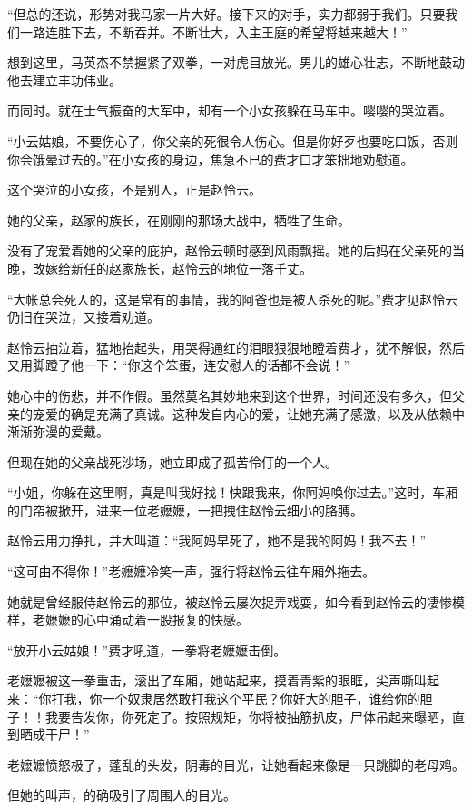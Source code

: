 \begin{this_body}
“但总的还说，形势对我马家一片大好。接下来的对手，实力都弱于我们。只要我们一路连胜下去，不断吞并。不断壮大，入主王庭的希望将越来越大！”

想到这里，马英杰不禁握紧了双拳，一对虎目放光。男儿的雄心壮志，不断地鼓动他去建立丰功伟业。

而同时。就在士气振奋的大军中，却有一个小女孩躲在马车中。嘤嘤的哭泣着。

“小云姑娘，不要伤心了，你父亲的死很令人伤心。但是你好歹也要吃口饭，否则你会饿晕过去的。”在小女孩的身边，焦急不已的费才口才笨拙地劝慰道。

这个哭泣的小女孩，不是别人，正是赵怜云。

她的父亲，赵家的族长，在刚刚的那场大战中，牺牲了生命。

没有了宠爱着她的父亲的庇护，赵怜云顿时感到风雨飘摇。她的后妈在父亲死的当晚，改嫁给新任的赵家族长，赵怜云的地位一落千丈。

“大帐总会死人的，这是常有的事情，我的阿爸也是被人杀死的呢。”费才见赵怜云仍旧在哭泣，又接着劝道。

赵怜云抽泣着，猛地抬起头，用哭得通红的泪眼狠狠地瞪着费才，犹不解恨，然后又用脚蹬了他一下：“你这个笨蛋，连安慰人的话都不会说！”

她心中的伤悲，并不作假。虽然莫名其妙地来到这个世界，时间还没有多久，但父亲的宠爱的确是充满了真诚。这种发自内心的爱，让她充满了感激，以及从依赖中渐渐弥漫的爱戴。

但现在她的父亲战死沙场，她立即成了孤苦伶仃的一个人。

“小姐，你躲在这里啊，真是叫我好找！快跟我来，你阿妈唤你过去。”这时，车厢的门帘被掀开，进来一位老嬷嬷，一把拽住赵怜云细小的胳膊。

赵怜云用力挣扎，并大叫道：“我阿妈早死了，她不是我的阿妈！我不去！”

“这可由不得你！”老嬷嬷冷笑一声，强行将赵怜云往车厢外拖去。

她就是曾经服侍赵怜云的那位，被赵怜云屡次捉弄戏耍，如今看到赵怜云的凄惨模样，老嬷嬷的心中涌动着一股报复的快感。

“放开小云姑娘！”费才吼道，一拳将老嬷嬷击倒。

老嬷嬷被这一拳重击，滚出了车厢，她站起来，摸着青紫的眼眶，尖声嘶叫起来：“你打我，你一个奴隶居然敢打我这个平民？你好大的胆子，谁给你的胆子！！我要告发你，你死定了。按照规矩，你将被抽筋扒皮，尸体吊起来曝晒，直到晒成干尸！”

老嬷嬷愤怒极了，蓬乱的头发，阴毒的目光，让她看起来像是一只跳脚的老母鸡。

但她的叫声，的确吸引了周围人的目光。


\end{this_body}
